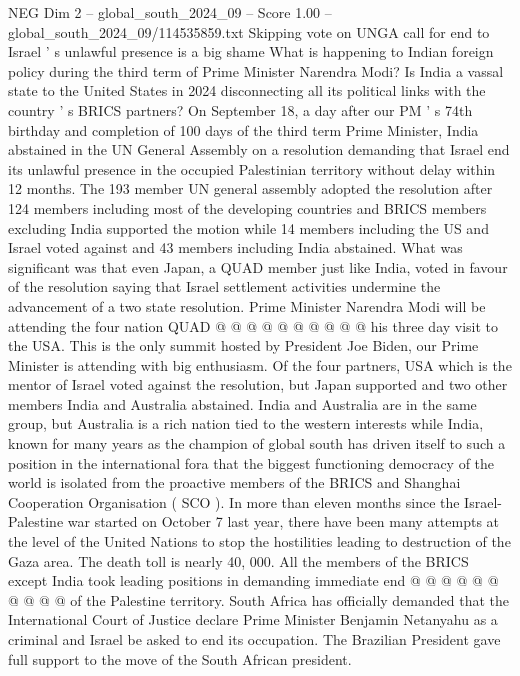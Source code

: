 \begin{textsample}{NEG Dim 2 – global\_south\_2024\_09 – Score 1.00 – global\_south\_2024\_09/114535859.txt}  \label{ex:f2_neg_249}
Skipping vote on UNGA call for end to Israel ' s unlawful presence is a big shame What is happening to Indian foreign policy during the third term of Prime Minister Narendra Modi?
Is India a vassal state to the United States in 2024 disconnecting all its political links with the country ' s BRICS partners?
On September 18, a day after our PM ' s 74th birthday and completion of 100 days of the third term Prime Minister, India abstained in the UN General Assembly on a resolution demanding that Israel end its unlawful presence in the occupied Palestinian territory without delay within 12 months.
The 193 member UN general assembly adopted the resolution after 124 members including most of the developing countries and BRICS members excluding India supported the motion while 14 members including the US and Israel voted against and 43 members including India abstained.
What was significant was that even Japan, a QUAD member just like India, voted in favour of the resolution saying that Israel settlement activities undermine the advancement of a two state resolution.
Prime Minister Narendra Modi will be attending the four nation QUAD @ @ @ @ @ @ @ @ @ @ his three day visit to the USA.
This is the only summit hosted by President Joe Biden, our Prime Minister is attending with big enthusiasm.
Of the four partners, USA which is the mentor of Israel voted against the resolution, but Japan supported and two other members India and Australia abstained.
India and Australia are in the same group, but Australia is a rich nation tied to the western interests while India, known for many years as the champion of global south has driven itself to such a position in the international fora that the biggest functioning democracy of the world is isolated from the proactive members of the BRICS and Shanghai Cooperation Organisation ( SCO ).
In more than eleven months since the Israel-Palestine war started on October 7 last year, there have been many attempts at the level of the United Nations to stop the hostilities leading to destruction of the Gaza area.
The death toll is nearly 40, 000.
All the members of the BRICS except India took leading positions in demanding immediate end @ @ @ @ @ @ @ @ @ @ of the Palestine territory.
South Africa has officially demanded that the International Court of Justice declare Prime Minister Benjamin Netanyahu as a criminal and Israel be asked to end its occupation.
The Brazilian President gave full support to the move of the South African president.

\end{textsample}
